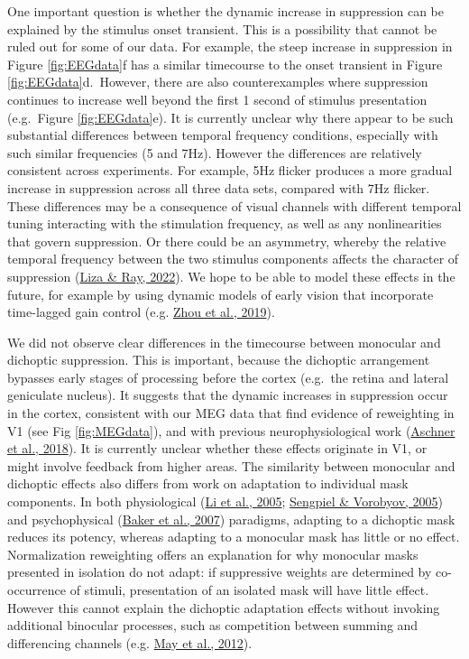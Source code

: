 \documentclass[
]{article}
\begin{document}
One important question is whether the dynamic increase in suppression can be explained by the stimulus onset transient. This is a possibility that cannot be ruled out for some of our data. For example, the steep increase in suppression in Figure \ref{fig:EEGdata}f has a similar timecourse to the onset transient in Figure \ref{fig:EEGdata}d.~However, there are also counterexamples where suppression continues to increase well beyond the first 1 second of stimulus presentation (e.g.~Figure \ref{fig:EEGdata}e). It is currently unclear why there appear to be such substantial differences between temporal frequency conditions, especially with such similar frequencies (5 and 7Hz). However the differences are relatively consistent across experiments. For example, 5Hz flicker produces a more gradual increase in suppression across all three data sets, compared with 7Hz flicker. These differences may be a consequence of visual channels with different temporal tuning interacting with the stimulation frequency, as well as any nonlinearities that govern suppression. Or there could be an asymmetry, whereby the relative temporal frequency between the two stimulus components affects the character of suppression (\protect\hyperlink{ref-Liza2022}{Liza \& Ray, 2022}). We hope to be able to model these effects in the future, for example by using dynamic models of early vision that incorporate time-lagged gain control (e.g. \protect\hyperlink{ref-Zhou2019}{Zhou et al., 2019}).

We did not observe clear differences in the timecourse between monocular and dichoptic suppression. This is important, because the dichoptic arrangement bypasses early stages of processing before the cortex (e.g.~the retina and lateral geniculate nucleus). It suggests that the dynamic increases in suppression occur in the cortex, consistent with our MEG data that find evidence of reweighting in V1 (see Fig \ref{fig:MEGdata}), and with previous neurophysiological work (\protect\hyperlink{ref-Aschner2018}{Aschner et al., 2018}). It is currently unclear whether these effects originate in V1, or might involve feedback from higher areas. The similarity between monocular and dichoptic effects also differs from work on adaptation to individual mask components. In both physiological (\protect\hyperlink{ref-Li2005}{Li et al., 2005}; \protect\hyperlink{ref-Sengpiel2005}{Sengpiel \& Vorobyov, 2005}) and psychophysical (\protect\hyperlink{ref-Baker2007}{Baker et al., 2007}) paradigms, adapting to a dichoptic mask reduces its potency, whereas adapting to a monocular mask has little or no effect. Normalization reweighting offers an explanation for why monocular masks presented in isolation do not adapt: if suppressive weights are determined by co-occurrence of stimuli, presentation of an isolated mask will have little effect. However this cannot explain the dichoptic adaptation effects without invoking additional binocular processes, such as competition between summing and differencing channels (e.g. \protect\hyperlink{ref-May2012}{May et al., 2012}).
\end{document}
